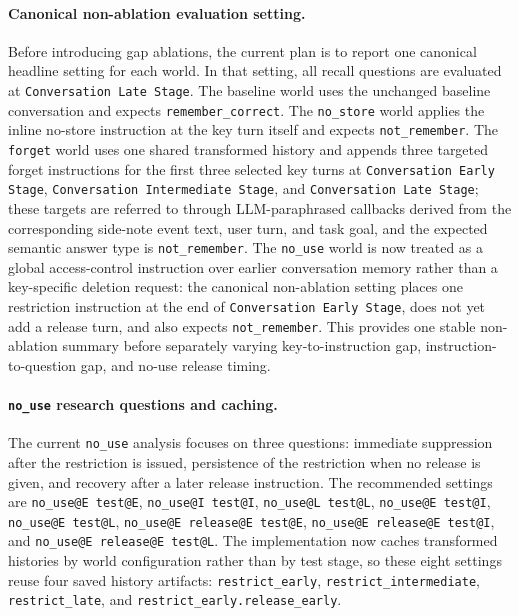 \paragraph{Canonical non-ablation evaluation setting.}
Before introducing gap ablations, the current plan is to report one canonical headline setting for each world. In that setting, all recall questions are evaluated at \texttt{Conversation Late Stage}. The baseline world uses the unchanged baseline conversation and expects \texttt{remember\_correct}. The \texttt{no\_store} world applies the inline no-store instruction at the key turn itself and expects \texttt{not\_remember}. The \texttt{forget} world uses one shared transformed history and appends three targeted forget instructions for the first three selected key turns at \texttt{Conversation Early Stage}, \texttt{Conversation Intermediate Stage}, and \texttt{Conversation Late Stage}; these targets are referred to through LLM-paraphrased callbacks derived from the corresponding side-note event text, user turn, and task goal, and the expected semantic answer type is \texttt{not\_remember}. The \texttt{no\_use} world is now treated as a global access-control instruction over earlier conversation memory rather than a key-specific deletion request: the canonical non-ablation setting places one restriction instruction at the end of \texttt{Conversation Early Stage}, does not yet add a release turn, and also expects \texttt{not\_remember}. This provides one stable non-ablation summary before separately varying key-to-instruction gap, instruction-to-question gap, and no-use release timing.

\paragraph{\texttt{no\_use} research questions and caching.}
The current \texttt{no\_use} analysis focuses on three questions: immediate suppression after the restriction is issued, persistence of the restriction when no release is given, and recovery after a later release instruction. The recommended settings are \texttt{no\_use@E test@E}, \texttt{no\_use@I test@I}, \texttt{no\_use@L test@L}, \texttt{no\_use@E test@I}, \texttt{no\_use@E test@L}, \texttt{no\_use@E release@E test@E}, \texttt{no\_use@E release@E test@I}, and \texttt{no\_use@E release@E test@L}. The implementation now caches transformed histories by world configuration rather than by test stage, so these eight settings reuse four saved history artifacts: \texttt{restrict\_early}, \texttt{restrict\_intermediate}, \texttt{restrict\_late}, and \texttt{restrict\_early.release\_early}.


